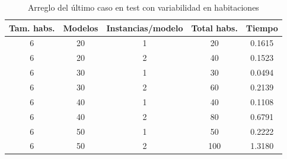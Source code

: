\begin{table}[H]
\begin{center}
	\begin{tabular}{ | c | c | c | c | c | }
\hline
Tam. habs. & Modelos & Instancias/modelo & Total habs. & Tiempo \\ \hline 
6 & 20 & 1 & 20 & 0.1615 \\ 
6 & 20 & 2 & 40 & 0.1523 \\ 
6 & 30 & 1 & 30 & 0.0494 \\ 
6 & 30 & 2 & 60 & 0.2139 \\ 
6 & 40 & 1 & 40 & 0.1108 \\ 
6 & 40 & 2 & 80 & 0.6791 \\ 
6 & 50 & 1 & 50 & 0.2222 \\ 
6 & 50 & 2 & 100 & 1.3180 \\ 

\hline
	\end{tabular}
\end{center}
\caption{Arreglo del último caso en test con variabilidad en habitaciones}
\label{table:optvarfix}
\end{table}



